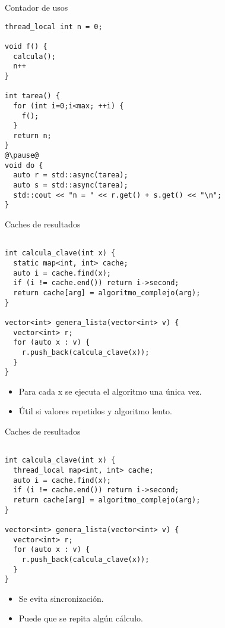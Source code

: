 \begin{frame}[t,fragile]{Contador de usos}
\begin{lstlisting}[escapechar=@]
thread_local int n = 0;

void f() {
  calcula();
  n++
}

int tarea() {
  for (int i=0;i<max; ++i) {
    f();
  }
  return n;
}
@\pause@
void do {
  auto r = std::async(tarea);
  auto s = std::async(tarea);
  std::cout << "n = " << r.get() + s.get() << "\n";
}
\end{lstlisting}
\end{frame}

\begin{frame}[t,fragile]{Caches de resultados}
\begin{lstlisting}

int calcula_clave(int x) {
  static map<int, int> cache;
  auto i = cache.find(x);
  if (i != cache.end()) return i->second;
  return cache[arg] = algoritmo_complejo(arg);
}

vector<int> genera_lista(vector<int> v) {
  vector<int> r;
  for (auto x : v) {
    r.push_back(calcula_clave(x));
  }
}
\end{lstlisting}
\begin{itemize}
  \item Para cada x se ejecuta el algoritmo una única vez.
  \item Útil si valores repetidos y algoritmo lento.
\end{itemize}
\end{frame}

\begin{frame}[t,fragile]{Caches de resultados}
\begin{lstlisting}

int calcula_clave(int x) {
  thread_local map<int, int> cache;
  auto i = cache.find(x);
  if (i != cache.end()) return i->second;
  return cache[arg] = algoritmo_complejo(arg);
}

vector<int> genera_lista(vector<int> v) {
  vector<int> r;
  for (auto x : v) {
    r.push_back(calcula_clave(x));
  }
}
\end{lstlisting}
\begin{itemize}
  \item Se evita sincronización.
  \item Puede que se repita algún cálculo.
\end{itemize}
\end{frame}
